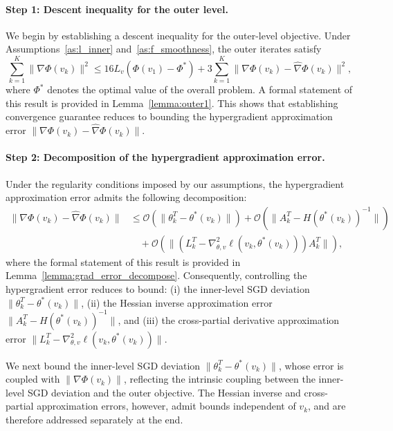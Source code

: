 \documentclass[11 pt]{article}
\begin{document}
\paragraph{Step 1: Descent inequality for the outer level.}
We begin by establishing a descent inequality for the outer-level objective. Under Assumptions~\ref{as:l_inner} and~\ref{as:f_smoothness}, the outer iterates satisfy 
\[ \sum_{k=1}^{K} \|\nabla\Phi(v_k)\|^2 \le
16L_v(\Phi(v_1) - \Phi^*) +
3
\sum_{k=1}^{K}
\|\nabla\Phi(v_k) - \widehat{\nabla}\Phi(v_k)\|^2,
\]
where $\Phi^*$ denotes the optimal value of the overall problem. A formal statement of this result is provided in
Lemma~\ref{lemma:outer1}. This shows that establishing convergence guarantee reduces to bounding the hypergradient approximation error
$\|\nabla\Phi(v_k) - \widehat{\nabla}\Phi(v_k)\|$.

\paragraph{Step 2: Decomposition of the hypergradient approximation error.}
Under the regularity conditions imposed by our assumptions, the hypergradient approximation error admits the following decomposition:
\begin{align*}
\|\nabla\Phi(v_k) - \widehat{\nabla}\Phi(v_k)\|  
&\le
\mathcal{O}\left(
\|\theta_k^{T} - \theta^*(v_k)\|\right)+ \mathcal{O}\left(
\|A_k^{T} - H(\theta^*(v_k))^{-1}\|\right) \nonumber\\
& \quad+ \mathcal{O}\left(
\bigl\|
(L_k^{T} - \nabla_{\theta,v}^2\ell(v_k,\theta^*(v_k))) A_k^{T}
\bigr\|\right),
\end{align*}
where the formal statement of this result is provided in Lemma~\ref{lemma:grad_error_decompose}. Consequently, controlling the hypergradient error reduces to bound:  
(i) the inner-level SGD deviation $\|\theta_k^{T} - \theta^*(v_k)\|$,  
(ii) the Hessian inverse approximation error $\|A_k^{T} - H(\theta^*(v_k))^{-1}\|$,  
and (iii) the cross-partial derivative approximation error  
$\|L_k^{T} - \nabla_{\theta,v}^2\ell(v_k,\theta^*(v_k))\|$. 

We next bound the inner-level SGD deviation $\|\theta_k^{T} - \theta^*(v_k)\|$, whose error is coupled with
$\|\nabla\Phi(v_k)\|$, reflecting the intrinsic coupling between the inner-level SGD deviation and the outer objective. The Hessian inverse and cross-partial approximation errors, however, admit bounds independent of $v_k$, and are therefore addressed separately at the end.
\end{document}
